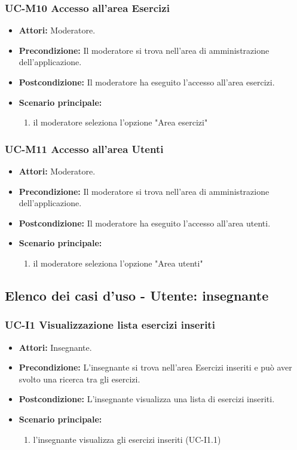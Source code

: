 \subsubsection{UC-M10 Accesso all'area Esercizi}
\begin{itemize}
	\item \textbf{Attori:} Moderatore.
	\item \textbf{Precondizione:} Il moderatore si trova nell'area di amministrazione dell'applicazione.
	\item \textbf{Postcondizione:} Il moderatore ha eseguito l'accesso all'area esercizi.
	\item \textbf{Scenario principale:}
	\begin{enumerate}
		\item il moderatore seleziona l'opzione "Area esercizi"
	\end{enumerate}
\end{itemize}

\subsubsection{UC-M11 Accesso all'area Utenti}
\begin{itemize}
	\item \textbf{Attori:} Moderatore.
	\item \textbf{Precondizione:} Il moderatore si trova nell'area di amministrazione dell'applicazione.
	\item \textbf{Postcondizione:} Il moderatore ha eseguito l'accesso all'area utenti.
	\item \textbf{Scenario principale:}
	\begin{enumerate}
		\item il moderatore seleziona l'opzione "Area utenti"
	\end{enumerate}
\end{itemize}

\subsection{Elenco dei casi d'uso - Utente: insegnante}		
\subsubsection{UC-I1 Visualizzazione lista esercizi inseriti}
\begin{itemize}
\item \textbf{Attori: }Insegnante.
		\item \textbf{Precondizione: }L'insegnante si trova nell'area Esercizi inseriti e può aver svolto una ricerca tra gli esercizi.
		\item \textbf{Postcondizione: }L'insegnante visualizza una lista di esercizi inseriti. 
		\item \textbf{Scenario principale:}
		\begin{enumerate}
			\item l'insegnante visualizza gli esercizi inseriti (UC-I1.1)
		\end{enumerate}
	\end{itemize}

